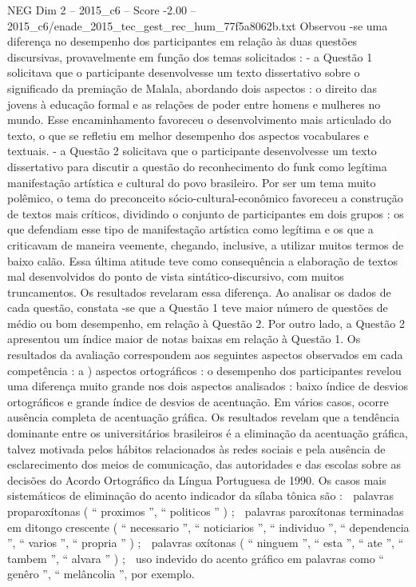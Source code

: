 \begin{textsample}{NEG Dim 2 – 2015\_c6 – Score -2.00 – 2015\_c6/enade\_2015\_tec\_gest\_rec\_hum\_77f5a8062b.txt}
Observou -se uma diferença no desempenho dos participantes em relação às duas questões discursivas, provavelmente em função dos temas solicitados : - a Questão 1 solicitava que o participante desenvolvesse um texto dissertativo sobre o significado da premiação de Malala, abordando dois aspectos : o direito das jovens à educação formal e as relações de poder entre homens e mulheres no mundo.
Esse encaminhamento favoreceu o desenvolvimento mais articulado do texto, o que se refletiu em melhor desempenho dos aspectos vocabulares e textuais. - a Questão 2 solicitava que o participante desenvolvesse um texto dissertativo para discutir a questão do reconhecimento do funk como legítima manifestação artística e cultural do povo brasileiro.
Por ser um tema muito polêmico, o tema do preconceito sócio-cultural-econômico favoreceu a construção de textos mais críticos, dividindo o conjunto de participantes em dois grupos : os que defendiam esse tipo de manifestação artística como legítima e os que a criticavam de maneira veemente, chegando, inclusive, a utilizar muitos termos de baixo calão.
Essa última atitude teve como consequência a elaboração de textos mal desenvolvidos do ponto de vista sintático-discursivo, com muitos truncamentos.
Os resultados revelaram essa diferença.
Ao analisar os dados de cada questão, constata -se que a Questão 1 teve maior número de questões de médio ou bom desempenho, em relação à Questão 2.
Por outro lado, a Questão 2 apresentou um índice maior de notas baixas em relação à Questão 1.
Os resultados da avaliação correspondem aos seguintes aspectos observados em cada competência : a ) aspectos ortográficos : o desempenho dos participantes revelou uma diferença muito grande nos dois aspectos analisados : baixo índice de desvios ortográficos e grande índice de desvios de acentuação.
Em vários casos, ocorre ausência completa de acentuação gráfica.
Os resultados revelam que a tendência dominante entre os universitários brasileiros é a eliminação da acentuação gráfica, talvez motivada pelos hábitos relacionados às redes sociais e pela ausência de esclarecimento dos meios de comunicação, das autoridades e das escolas sobre as decisões do Acordo Ortográfico da Língua Portuguesa de 1990.
Os casos mais sistemáticos de eliminação do acento indicador da sílaba tônica são :  palavras proparoxítonas ( “ proximos ”, “ politicos ” ) ;  palavras paroxítonas terminadas em ditongo crescente ( “ necessario ”, “ noticiarios ”, “ individuo ”, “ dependencia ”, “ varios ”, “ propria ” ) ;  palavras oxítonas ( “ ninguem ”, “ esta ”, “ ate ”, “ tambem ”, “ alvara ” ) ;  uso indevido do acento gráfico em palavras como “ genêro ”, “ melâncolia ”, por exemplo.

\end{textsample}
